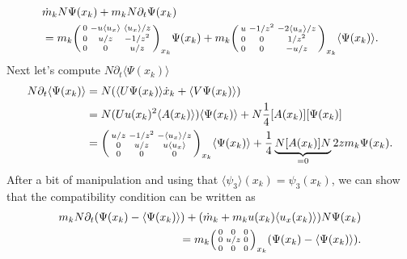 \documentclass[english,master]{liumaiex}
\theoremstyle{plain}
\theoremstyle{definition}
\begin{document}
\begin{equation}
\begin{aligned}
	&\dot{m}_k N \Psi(x_k) + m_k N \partial_t \Psi(x_k) \\
	&= m_k
	\begin{psmallmatrix}
		0 & -u\langle u_x \rangle & \langle u_x \rangle/z \\
		0 & u/z & -1/z^2 \\
		0 & 0 & u/z \\
	\end{psmallmatrix}_{x_k} \Psi(x_k)
	+m_k
	\begin{psmallmatrix}
		u & -1/z^2 & -2\langle u_x \rangle/z \\
		0 & 0 & 1/z^2 \\
		0 & 0 & -u/z \\
	\end{psmallmatrix}_{x_k} \langle \Psi(x_k) \rangle.
\end{aligned}
\end{equation}
%
Next let's compute $N \partial_t \langle \Psi(x_k) \rangle$
\begin{equation}
\begin{aligned}
	N \partial_t \langle \Psi(x_k) \rangle 
	&= N (\langle U \Psi(x_k) \rangle \dot{x}_k + \langle V \Psi(x_k) \rangle)\\
	&= N (U u(x_k)^2 \langle A(x_k) \rangle) \langle \Psi(x_k) \rangle + N\frac{1}{4}[A(x_k)][\Psi(x_k)] \\
	&= 
	\begin{psmallmatrix}
		u/z & -1/z^2 & -\langle u_x \rangle/z \\
		0 & u/z & u \langle u_x \rangle \\
		0 & 0 & 0 \\
	\end{psmallmatrix}_{x_k} \langle \Psi(x_k) \rangle
	+\frac{1}{4} \underbrace{N [A(x_k)] N}_{=0} 2z m_k \Psi(x_k).
\end{aligned}
\end{equation}
After a bit of manipulation and using that $\langle \psi_3 \rangle (x_k) = \psi_3(x_k)$, we can show that the compatibility condition can be written as
\begin{equation}
\begin{aligned}
	m_k N \partial_t (\Psi(x_k) - \langle \Psi(x_k) \rangle) + (\dot{m}_k + m_k u(x_k) \langle u_x(x_k) \rangle) N \Psi(x_k) \\
	= m_k \begin{psmallmatrix}
		0 & 0 & 0 \\
		0 & u/z & 0 \\
		0 & 0 & 0
	\end{psmallmatrix}_{x_k} (\Psi(x_k) - \langle \Psi(x_k) \rangle).
\end{aligned}
\end{equation}
\end{document}
